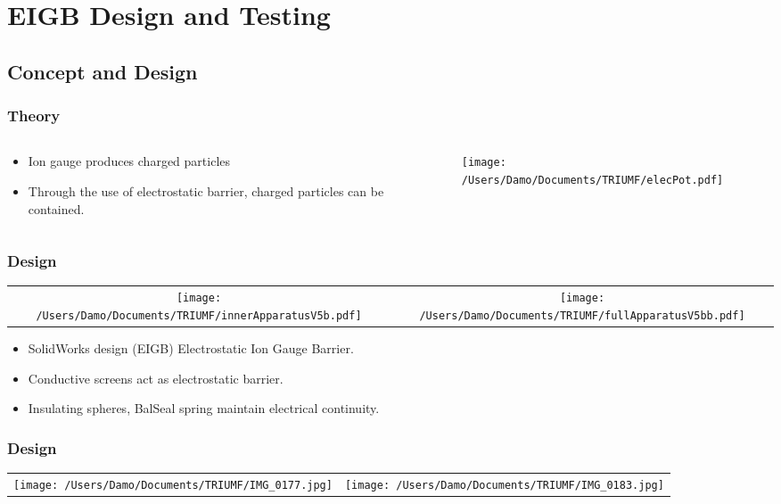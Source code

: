 \documentclass{beamer}
\begin{document}
\section{EIGB Design and Testing}
\subsection{Concept and Design}
\frame
{
  \frametitle{Theory}
  \begin{columns}[T]
    \begin{column}{0.50\textwidth}
      \begin{itemize}
        \item<1>Ion gauge produces charged particles
        \item<1>Through the use of electrostatic barrier, charged particles can be contained.
      \end{itemize}
    \end{column}
    \begin{column}{0.50\textwidth}
    \texttt{[image: /Users/Damo/Documents/TRIUMF/elecPot.pdf]}
    \end{column}
  \end{columns}
}
\frame
{
  \frametitle{Design}
  \begin{table}[htdp]
  \centering
  \begin{tabular}{cc}
  \texttt{[image: /Users/Damo/Documents/TRIUMF/innerApparatusV5b.pdf]}&\texttt{[image: /Users/Damo/Documents/TRIUMF/fullApparatusV5bb.pdf]}\\
  \end{tabular}
  \end{table}%
  \begin{itemize}
  \item<1>SolidWorks design (EIGB) Electrostatic Ion Gauge Barrier.
  \item<1>Conductive screens act as electrostatic barrier.
  \item<1>Insulating spheres, BalSeal spring maintain electrical continuity.
  \end{itemize}
}
\frame
{
\frametitle{Design}
  \begin{table}[htdp]
  \centering
  \begin{tabular}{cc}
  \texttt{[image: /Users/Damo/Documents/TRIUMF/IMG\_0177.jpg]}&\texttt{[image: /Users/Damo/Documents/TRIUMF/IMG\_0183.jpg]}\\
  \end{tabular}
  \end{table}%
  }
\end{document}
